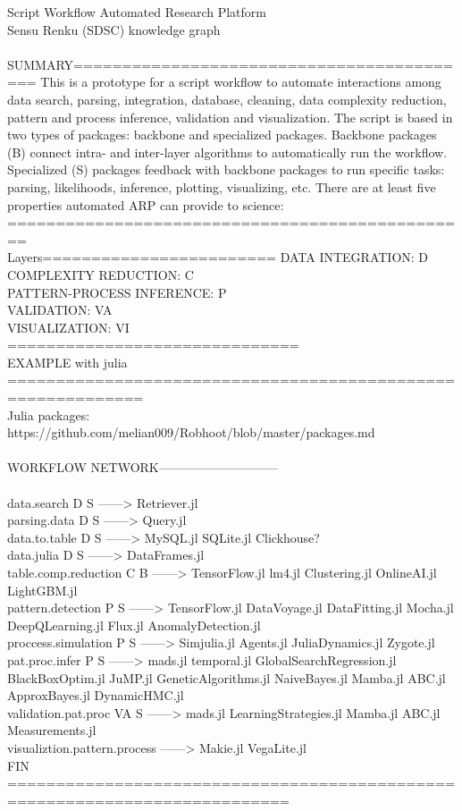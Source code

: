 \documentclass[english,12pt]{article}
\begin{document}
\newpage
Script Workflow Automated Research Platform \\
Sensu Renku (SDSC) knowledge graph \\
 \\
SUMMARY==========================================
This is a prototype for a script workflow to automate interactions among data search, parsing, integration, database, cleaning, data complexity reduction, pattern and process inference, validation and visualization. The script is based in two types of packages: backbone and specialized packages. Backbone packages (B) connect intra- and inter-layer algorithms to automatically run the workflow. Specialized (S) packages feedback with backbone packages to run specific tasks: parsing, likelihoods, inference, plotting, visualizing, etc. There are at least five properties automated ARP can provide to science:  \\

================================================
 \\
Layers========================
DATA INTEGRATION: D \\
COMPLEXITY REDUCTION: C \\
PATTERN-PROCESS INFERENCE: P \\
VALIDATION: VA \\
VISUALIZATION: VI \\
==============================
 \\
EXAMPLE with julia ============================================================ \\
Julia packages: \\
https://github.com/melian009/Robhoot/blob/master/packages.md \\
 \\
WORKFLOW NETWORK----------------------------- \\
 \\
data.search D S                ------> Retriever.jl \\
parsing.data D S               ------> Query.jl  \\
data.to.table D S              ------> MySQL.jl SQLite.jl Clickhouse? \\
data.julia D S                 ------> DataFrames.jl \\
table.comp.reduction C B       ------> TensorFlow.jl lm4.jl Clustering.jl OnlineAI.jl LightGBM.jl \\
pattern.detection P S          ------> TensorFlow.jl DataVoyage.jl DataFitting.jl Mocha.jl DeepQLearning.jl Flux.jl AnomalyDetection.jl \\
proccess.simulation P S        ------> Simjulia.jl Agents.jl JuliaDynamics.jl Zygote.jl \\
pat.proc.infer P S             ------> mads.jl temporal.jl GlobalSearchRegression.jl BlackBoxOptim.jl JuMP.jl GeneticAlgorithms.jl NaiveBayes.jl Mamba.jl ABC.jl ApproxBayes.jl DynamicHMC.jl \\
validation.pat.proc VA S       ------> mads.jl LearningStrategies.jl Mamba.jl ABC.jl Measurements.jl \\
visualiztion.pattern.process   ------> Makie.jl VegaLite.jl \\
FIN ===========================================================================
\end{document}
